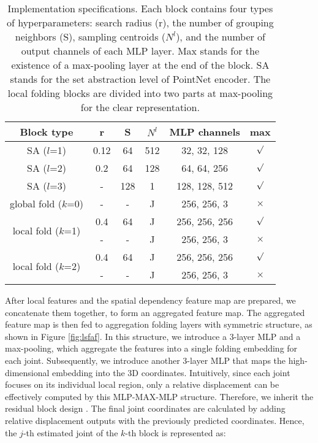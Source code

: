 \documentclass[10pt,twocolumn,letterpaper]{article}
\begin{document}
\begin{table}[h!]
\small
\setlength\tabcolsep{5pt}\begin{center}

\begin{tabular}{c|c|c|c|c|c}
\hline
Block type & r & S & $N^l$ & MLP channels & max\\
\hline
SA ($l$=1) & 0.12 & 64 & 512 & 32, 32, 128 &$\surd$\\
\hline
SA ($l$=2) & 0.2 & 64 & 128 & 64, 64, 256 &$\surd$\\
\hline

SA ($l$=3) & - & 128 & 1 & 128, 128, 512 &$\surd$\\
\hline

global fold ($k$=0) & - & - & J & 256, 256, 3 & $\times$\\
\hline
\multirow{2}{*}{local fold  ($k$=1)} & 0.4 & 64 & J & 256, 256, 256  &$\surd$ \\
\cline{2-6}
  & - & - & J & 256, 256, 3 & $\times$ \\
\hline
\multirow{2}{*}{local fold  ($k$=2)} & 0.4 & 64 & J & 256, 256, 256  &$\surd$ \\
\cline{2-6}
  & - & - & J & 256, 256, 3 & $\times$ \\
\hline


\end{tabular}
\end{center}
\caption{Implementation specifications. Each block contains four types of hyperparameters: search radius (r), the number of grouping neighbors (S), sampling centroids ($N^l$), and the number of output channels of each MLP layer. Max stands for the existence of a max-pooling layer at the end of the block. SA stands for the set abstraction level of PointNet encoder. The local folding blocks are divided into two parts at max-pooling for the clear representation.}
\label{tab:detail}
\end{table}

After local features and the spatial dependency feature map are prepared, we concatenate them together, to form an aggregated feature map. The aggregated feature map is then fed to aggregation folding layers with symmetric structure, as shown in Figure \ref{fig:lsfaf}. In this structure, we introduce a 3-layer MLP and a max-pooling, which aggregate the features into a single folding embedding for each joint. Subsequently, we introduce another 3-layer MLP that maps the high-dimensional embedding into the 3D coordinates. Intuitively, since each joint focuses on its individual local region, only a relative displacement can be effectively computed by this MLP-MAX-MLP structure. Therefore, we inherit the residual block design \cite{he2016deep}. The final joint coordinates are calculated by adding relative displacement outputs with the previously predicted coordinates. Hence, the $j$-th estimated joint of the $k$-th block is represented as:
\end{document}
